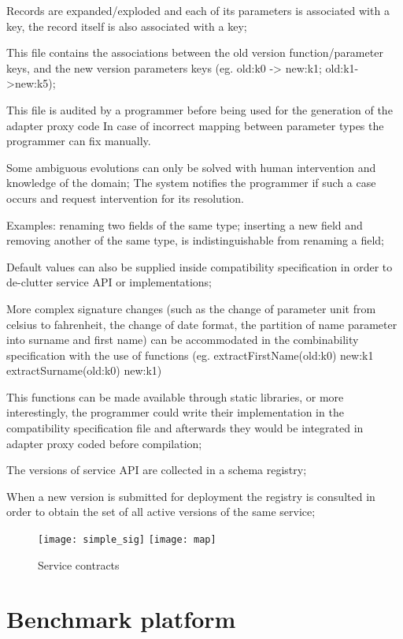 Records are expanded/exploded and each of its parameters is associated with a key, the record itself is also associated with a key;

This file contains the associations between the old version function/parameter keys, and the new version parameters keys (eg. old:k0 -> new:k1; old:k1->new:k5);

This file is audited by a programmer before being used for the generation of the adapter proxy code
In case of incorrect mapping between parameter types the programmer can fix manually.

Some ambiguous evolutions can only be solved with human intervention and knowledge of the domain;
The system notifies the programmer if such a case occurs and request intervention for its resolution.

Examples:
renaming two fields of the same type;
inserting a new field and removing another of the same type, is indistinguishable from renaming a field;

Default values can also be supplied inside compatibility specification in order to de-clutter service API or implementations;

More complex signature changes (such as the change of parameter unit from celsius to fahrenheit, the change of date format, the partition of name parameter into surname and first name)
can be accommodated in the combinability specification with the use of functions (eg. extractFirstName(old:k0) \textrightarrow new:k1  extractSurname(old:k0) \textrightarrow new:k1)

This functions can be made available through static libraries, or more interestingly, the programmer could write their implementation in the compatibility specification file
and afterwards they would be integrated in adapter proxy coded before compilation;

The versions of service API are collected in a schema registry;

When a new version is submitted for deployment the registry is consulted in order to obtain the set of all active versions of the same service;

\begin{figure}[htbp]
    \centering
    \texttt{[image: simple\_sig]}
    \texttt{[image: map]}
    \caption{Service contracts}
    \label{fig:simple}
\end{figure}

\section{Benchmark platform} %
\label{sec:benchmark_platform}


